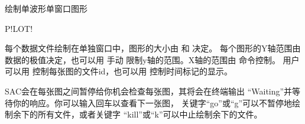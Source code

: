 \label{cmd:plot}

绘制单波形单窗口图形

\begin{SACSTX}
P!LOT!
\end{SACSTX}

每个数据文件绘制在单独窗口中，图形的大小由  和  决定。
每个图形的Y轴范围由数据的极值决定，也可以用  手动
限制y轴的范围。X轴的范围由  命令控制。
用户可以用  控制每张图的文件id，也可以用
  控制时间标记的显示。

SAC会在每张图之间暂停给你机会检查每张图，其将会在终端输出
``Waiting''并等待你的响应。你可以输入回车以查看下一张图，
关键字``go''或``g''可以不暂停地绘制余下的所有文件，或者关键字
``kill''或``k''可以中止绘制余下的文件。
